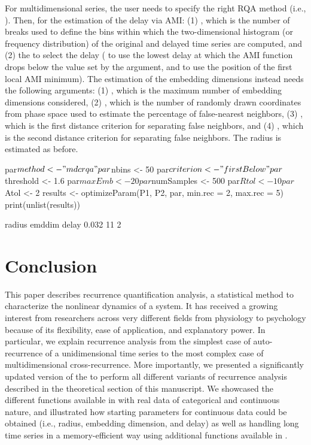 For multidimensional series, the user needs to specify the right RQA method (i.e., ). Then, for the estimation of the delay via AMI: (1) , which is the number of breaks used to define the bins within which the two-dimensional histogram (or frequency distribution) of the original and delayed time series are computed, and (2) the  to select the delay ( to use the lowest delay at which the AMI function drops below the value set by the  argument, and  to use the position of the first local AMI minimum). The estimation of the embedding dimensions instead needs the following arguments: (1) , which is the maximum number of embedding dimensions considered, (2) , which is the number of randomly drawn coordinates from phase space used to estimate the percentage of false-nearest neighbors, (3) , which is the first distance criterion for separating false neighbors, and (4) , which is the second distance criterion for separating false neighbors. The radius is estimated as before. 

\begin{example}
par$method <- "mdcrqa"
par$nbins <- 50
par$criterion <- "firstBelow"
par$threshold <- 1.6
par$maxEmb <- 20
par$numSamples <- 500
par$Rtol <- 10
par$Atol <- 2
results <- optimizeParam(P1, P2, par, min.rec = 2, max.rec = 5)
print(unlist(results))

radius  emddim  delay
0.032   11      2
\end{example}

\section{Conclusion}

This paper describes recurrence quantification analysis, a statistical method to characterize the nonlinear dynamics of a system. It has received a growing interest from researchers across very different fields from physiology to psychology because of its flexibility, ease of application, and explanatory power. In particular, we explain recurrence analysis from the simplest case of auto-recurrence of a unidimensional time series to the most complex case of multidimensional cross-recurrence. More importantly, we presented a significantly updated version of the  to perform all different variants of recurrence analysis described in the theoretical section of this manuscript. We showcased the different functions available in  with real data of categorical and continuous nature, and illustrated how starting parameters for continuous data could be obtained (i.e., radius, embedding dimension, and delay) as well as handling long time series in a memory-efficient way using additional functions available in .  

